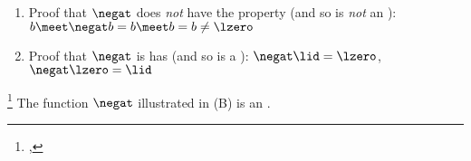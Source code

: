 \begin{proofns}
\begin{enumerate}
  \item Proof that $\negat$ does \emph{not} have the  property (and so is \emph{not} an ):
    \\$b\meet \negat b=b\meet b = b \neq \lzero$

  \item Proof that $\negat$ is has  (and so is a ): 
    $\negat\lid=\lzero$,\quad$\negat\lzero=\lid$
\end{enumerate}
\end{proofns}


\begin{example}
\footnote{
  ,
  }
\label{ex:negat_m2_ortho}
    The function $\negat$ illustrated in  (B) is an  .
\end{example}
